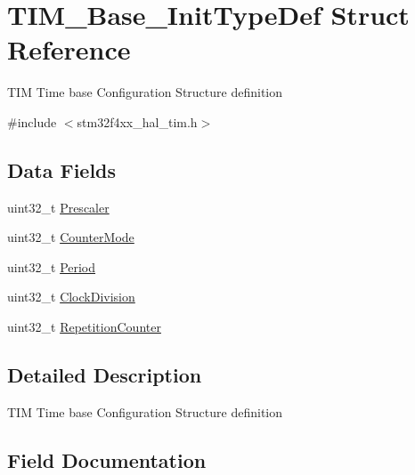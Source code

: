 \hypertarget{struct_t_i_m___base___init_type_def}{}\section{T\+I\+M\+\_\+\+Base\+\_\+\+Init\+Type\+Def Struct Reference}
\label{struct_t_i_m___base___init_type_def}


T\+IM Time base Configuration Structure definition ~\newline
  




{\ttfamily \#include $<$stm32f4xx\+\_\+hal\+\_\+tim.\+h$>$}

\subsection*{Data Fields}
\begin{DoxyCompactItemize}
\item 
uint32\+\_\+t \mbox{\hyperlink{struct_t_i_m___base___init_type_def_affb82025da5b8d4a06e61f1690460f4d}{Prescaler}}
\item 
uint32\+\_\+t \mbox{\hyperlink{struct_t_i_m___base___init_type_def_a4b29303489c983d0e9326d7ae0196ceb}{Counter\+Mode}}
\item 
uint32\+\_\+t \mbox{\hyperlink{struct_t_i_m___base___init_type_def_a49500eef6a2354eeee4adc005bf9cef6}{Period}}
\item 
uint32\+\_\+t \mbox{\hyperlink{struct_t_i_m___base___init_type_def_a8f20e02ae2774e1523942604315b8e13}{Clock\+Division}}
\item 
uint32\+\_\+t \mbox{\hyperlink{struct_t_i_m___base___init_type_def_a3c2ea8434bbce30aa191a816e27f9c1f}{Repetition\+Counter}}
\end{DoxyCompactItemize}


\subsection{Detailed Description}
T\+IM Time base Configuration Structure definition ~\newline
 

\subsection{Field Documentation}
\mbox{\label{struct_t_i_m___base___init_type_def_a8f20e02ae2774e1523942604315b8e13}} 
